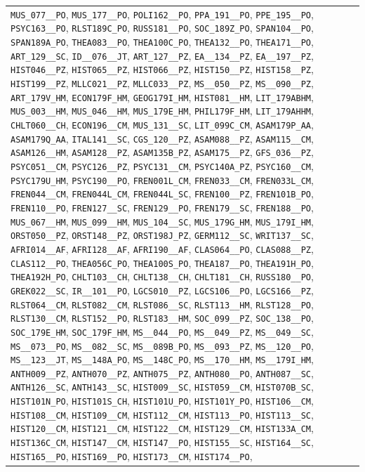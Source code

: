 \begin{longtable}{|p{4.4in}|p{4.4in}|}
\verb|MUS_077__PO|, \verb|MUS_177__PO|, \verb|POLI162__PO|, \verb|PPA_191__PO|, \verb|PPE_195__PO|, \verb|PSYC163__PO|, \verb|RLST189C_PO|, \verb|RUSS181__PO|, \verb|SOC_189Z_PO|, \verb|SPAN104__PO|, \verb|SPAN189A_PO|, \verb|THEA083__PO|, \verb|THEA100C_PO|, \verb|THEA132__PO|, \verb|THEA171__PO|, \verb|ART_129__SC|, \verb|ID__076__JT|, \verb|ART_127__PZ|, \verb|EA__134__PZ|, \verb|EA__197__PZ|, \verb|HIST046__PZ|, \verb|HIST065__PZ|, \verb|HIST066__PZ|, \verb|HIST150__PZ|, \verb|HIST158__PZ|, \verb|HIST199__PZ|, \verb|MLLC021__PZ|, \verb|MLLC033__PZ|, \verb|MS__050__PZ|, \verb|MS__090__PZ|, \verb|ART_179V_HM|, \verb|ECON179F_HM|, \verb|GEOG179I_HM|, \verb|HIST081__HM|, \verb|LIT_179ABHM|, \verb|MUS_003__HM|, \verb|MUS_046__HM|, \verb|MUS_179E_HM|, \verb|PHIL179F_HM|, \verb|LIT_179AHHM|, \verb|CHLT060__CH|, \verb|ECON196__CM|, \verb|MUS_131__SC|, \verb|LIT_099C_CM|, \verb|ASAM179P_AA|, \verb|ASAM179Q_AA|, \verb|ITAL141__SC|, \verb|CGS_120__PZ|, \verb|ASAM088__PZ|, \verb|ASAM115__CM|, \verb|ASAM126__HM|, \verb|ASAM128__PZ|, \verb|ASAM135B_PZ|, \verb|ASAM175__PZ|, \verb|GFS_036__PZ|, \verb|PSYC051__CM|, \verb|PSYC126__PZ|, \verb|PSYC131__CM|, \verb|PSYC140A_PZ|, \verb|PSYC160__CM|, \verb|PSYC179U_HM|, \verb|PSYC190__PO|, \verb|FREN001L_CM|, \verb|FREN033__CM|, \verb|FREN033L_CM|, \verb|FREN044__CM|, \verb|FREN044L_CM|, \verb|FREN044L_SC|, \verb|FREN100__PZ|, \verb|FREN101B_PO|, \verb|FREN110__PO|, \verb|FREN127__SC|, \verb|FREN129__PO|, \verb|FREN179__SC|, \verb|FREN188__PO|, \verb|MUS_067__HM|, \verb|MUS_099__HM|, \verb|MUS_104__SC|, \verb|MUS_179G_HM|, \verb|MUS_179I_HM|, \verb|ORST050__PZ|, \verb|ORST148__PZ|, \verb|ORST198J_PZ|, \verb|GERM112__SC|, \verb|WRIT137__SC|, \verb|AFRI014__AF|, \verb|AFRI128__AF|, \verb|AFRI190__AF|, \verb|CLAS064__PO|, \verb|CLAS088__PZ|, \verb|CLAS112__PO|, \verb|THEA056C_PO|, \verb|THEA100S_PO|, \verb|THEA187__PO|, \verb|THEA191H_PO|, \verb|THEA192H_PO|, \verb|CHLT103__CH|, \verb|CHLT138__CH|, \verb|CHLT181__CH|, \verb|RUSS180__PO|, \verb|GREK022__SC|, \verb|IR__101__PO|, \verb|LGCS010__PZ|, \verb|LGCS106__PO|, \verb|LGCS166__PZ|, \verb|RLST064__CM|, \verb|RLST082__CM|, \verb|RLST086__SC|, \verb|RLST113__HM|, \verb|RLST128__PO|, \verb|RLST130__CM|, \verb|RLST152__PO|, \verb|RLST183__HM|, \verb|SOC_099__PZ|, \verb|SOC_138__PO|, \verb|SOC_179E_HM|, \verb|SOC_179F_HM|, \verb|MS__044__PO|, \verb|MS__049__PZ|, \verb|MS__049__SC|, \verb|MS__073__PO|, \verb|MS__082__SC|, \verb|MS__089B_PO|, \verb|MS__093__PZ|, \verb|MS__120__PO|, \verb|MS__123__JT|, \verb|MS__148A_PO|, \verb|MS__148C_PO|, \verb|MS__170__HM|, \verb|MS__179I_HM|, \verb|ANTH009__PZ|, \verb|ANTH070__PZ|, \verb|ANTH075__PZ|, \verb|ANTH080__PO|, \verb|ANTH087__SC|, \verb|ANTH126__SC|, \verb|ANTH143__SC|, \verb|HIST009__SC|, \verb|HIST059__CM|, \verb|HIST070B_SC|, \verb|HIST101N_PO|, \verb|HIST101S_CH|, \verb|HIST101U_PO|, \verb|HIST101Y_PO|, \verb|HIST106__CM|, \verb|HIST108__CM|, \verb|HIST109__CM|, \verb|HIST112__CM|, \verb|HIST113__PO|, \verb|HIST113__SC|, \verb|HIST120__CM|, \verb|HIST121__CM|, \verb|HIST122__CM|, \verb|HIST129__CM|, \verb|HIST133A_CM|, \verb|HIST136C_CM|, \verb|HIST147__CM|, \verb|HIST147__PO|, \verb|HIST155__SC|, \verb|HIST164__SC|, \verb|HIST165__PO|, \verb|HIST169__PO|, \verb|HIST173__CM|, \verb|HIST174__PO|, 
\end{longtable}
